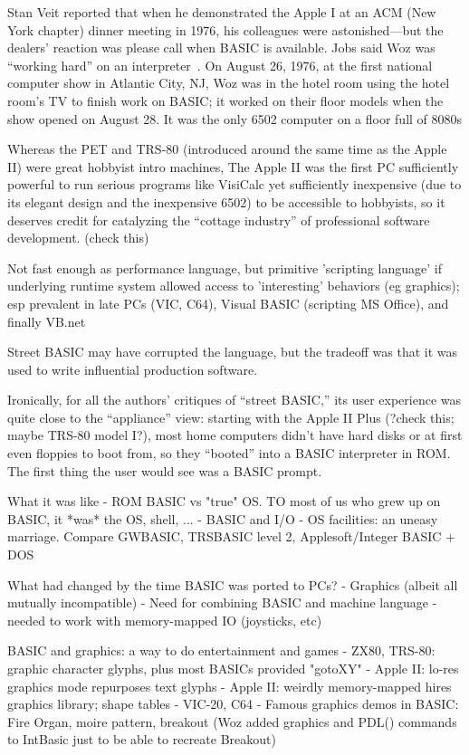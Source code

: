 \documentclass{article}
\begin{document}
Stan Veit reported that when he demonstrated the Apple I at an ACM (New
York chapter) dinner meeting in 1976, his colleagues were
astonished---but the dealers' reaction was please call when BASIC is
available.  Jobs said Woz was ``working hard'' on an
interpreter~\cite[pp. 92ff]{veit}.
On August 26, 1976, at the first national computer show in Atlantic City,
NJ, Woz was in the hotel room using the hotel room's TV to finish work
on BASIC; it worked on their floor models when the show opened on August
28.  It was the only 6502 computer on a floor full of 8080s

Whereas the PET and TRS-80 (introduced around the same time as the Apple
II) were great hobbyist intro machines, The Apple II was the first PC
sufficiently powerful to run serious programs like VisiCalc yet
sufficiently inexpensive (due to its elegant design and the inexpensive
6502) to be accessible to hobbyists, so it deserves credit for
catalyzing the ``cottage industry'' of professional software
development.
(check this)

Not fast enough as performance language, but primitive 'scripting
language' if underlying runtime system allowed access to 'interesting'
behaviors (eg graphics); esp prevalent in late PCs (VIC, C64), Visual
BASIC (scripting MS Office), and finally VB.net


Street BASIC may have corrupted the language, but the tradeoff was that
it was used to write influential production software.

Ironically, for all the authors' critiques of ``street BASIC,'' its user
experience was quite close to the ``appliance'' view: starting with the
Apple II Plus (?check this; maybe TRS-80 model I?), most home computers
didn't have hard disks or at first even floppies to boot from, so they
``booted'' into a BASIC interpreter in ROM.  The first thing the user
would see was a BASIC prompt. 


What it was like
  - ROM BASIC vs "true" OS.  TO most of us who grew up on BASIC, it
  *was* the OS, shell, ...
  - BASIC and I/O - OS facilities: an uneasy marriage.  Compare GWBASIC,
  TRSBASIC level 2, Applesoft/Integer BASIC + DOS

What had changed by the time BASIC was ported to PCs?
-  Graphics (albeit all mutually incompatible)
-  Need for combining BASIC and machine language
-  needed to work with memory-mapped IO (joysticks, etc)


BASIC and graphics: a way to do entertainment and games
  - ZX80, TRS-80: graphic character glyphs, plus most BASICs provided "gotoXY"
  - Apple II: lo-res graphics mode repurposes text glyphs
  - Apple II: weirdly memory-mapped hires graphics library; shape tables
  - VIC-20, C64
  - Famous graphics demos in BASIC: Fire Organ, moire pattern, breakout
  (Woz added graphics and PDL() commands to IntBasic just to be able to
  recreate Breakout)
\end{document}
